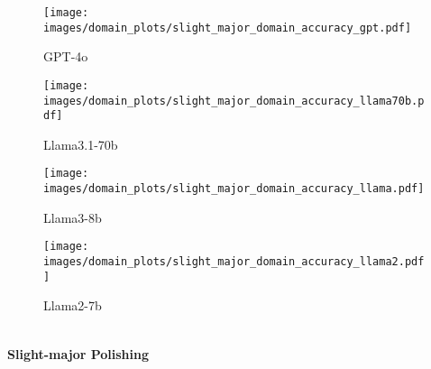 \begin{figure*}[htbp]
    \vspace{0.5cm} %
    \begin{minipage}{\textwidth}
    \centering
        \begin{subfigure}{0.24\textwidth}
            \centering
            \texttt{[image: images/domain\_plots/slight\_major\_domain\_accuracy\_gpt.pdf]}
            \caption{GPT-4o}
        \end{subfigure}
        \hfill
        \begin{subfigure}{0.24\textwidth}
            \centering
            \texttt{[image: images/domain\_plots/slight\_major\_domain\_accuracy\_llama70b.pdf]}
            \caption{Llama3.1-70b}
        \end{subfigure}
        \hfill
        \begin{subfigure}{0.24\textwidth}
            \centering
            \texttt{[image: images/domain\_plots/slight\_major\_domain\_accuracy\_llama.pdf]}
            \caption{Llama3-8b}
        \end{subfigure}
        \hfill
        \begin{subfigure}{0.24\textwidth}
            \centering
            \texttt{[image: images/domain\_plots/slight\_major\_domain\_accuracy\_llama2.pdf]}
            \caption{Llama2-7b}
        \end{subfigure}
        \\ %
        \vspace{0.2cm}
        \small \textbf{Slight-major Polishing}
    \end{minipage}


\end{figure*}
